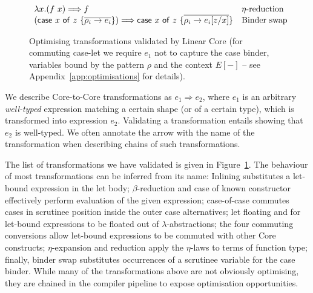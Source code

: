 \documentclass[acmsmall,review,anonymous]{acmart}
\newcommand{\ccase}[2]{\mathsf{case}~#1~\mathsf{of}~#2}
\begin{document}
\begin{figure}[t]
{\[\begin{array}{ll}
      \lambda x.(f~x) \Longrightarrow f & \mbox{$\eta$-reduction}\\
      (\ccase{x}{z~\{\ov{\rho_i\to e_i}\}}) \Longrightarrow \ccase{x}{z~\{\ov{\rho_i\to  e_i[z/x]}\}}
                                                                      & \mbox{Binder swap}\\
    \end{array}
  \]}
  \caption{Optimising transformations validated by Linear
    Core\label{fig:opttrans} (for commuting case-let we
      require $e_1$ not to capture the case binder, variables bound by the
      pattern $\rho$ and the context $E[{-}]$ -- see Appendix~\ref{app:optimisations} for
    details).} 
\end{figure}





We describe Core-to-Core transformations as $e_1 \Longrightarrow e_2$,
where $e_1$ is an arbitrary \emph{well-typed} expression
matching a certain shape (or of a certain type), which is
transformed into expression $e_2$. Validating a transformation
entails showing that $e_2$ is well-typed. We often annotate the arrow
with the name of the transformation when describing chains of such
transformations.

The list of transformations we have
validated is given in Figure~\ref{fig:opttrans}.
%
The behaviour of most transformations can be inferred from its name:
Inlining substitutes a let-bound expression in the let body; $\beta$-reduction
and case of known constructor effectively perform evaluation of the given expression;
case-of-case commutes cases in scrutinee position inside the outer case alternatives;
let floating and  for let-bound expressions to be floated out of $\lambda$-abstractions;
the four commuting conversions allow let-bound expressions to be commuted with other
Core constructs; $\eta$-expansion and reduction apply the $\eta$-laws to terms of function type;
finally, binder swap substitutes occurrences of a scrutinee variable for the
case binder. While many of the transformations above are not obviously optimising,
they are chained in the compiler pipeline to expose optimisation opportunities.


\end{document}
